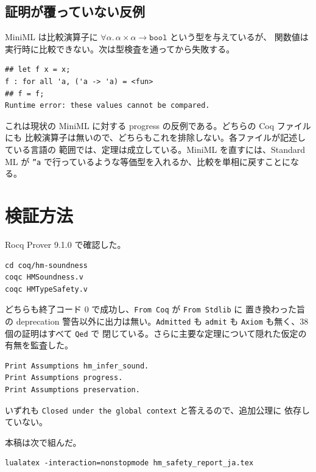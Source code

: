 \documentclass[11pt,a4paper]{ltjsarticle}
\newcommand{\tbool}{\mathtt{bool}}
\begin{document}
\subsection{証明が覆っていない反例}

MiniML は比較演算子に
$\forall\alpha.\,\alpha \times \alpha \to \tbool$ という型を与えているが、
関数値は実行時に比較できない。次は型検査を通ってから失敗する。

\begin{lstlisting}
## let f x = x;
f : for all 'a, ('a -> 'a) = <fun>
## f = f;
Runtime error: these values cannot be compared.
\end{lstlisting}

これは現状の MiniML に対する progress の反例である。どちらの Coq ファイルにも
比較演算子は無いので、どちらもこれを排除しない。各ファイルが記述している言語の
範囲では、定理は成立している。MiniML を直すには、Standard ML が
\texttt{''a} で行っているような等価型を入れるか、比較を単相に戻すことになる。

\section{検証方法}

Rocq Prover 9.1.0 で確認した。

\begin{lstlisting}
cd coq/hm-soundness
coqc HMSoundness.v
coqc HMTypeSafety.v
\end{lstlisting}

どちらも終了コード 0 で成功し、\texttt{From Coq} が \texttt{From Stdlib} に
置き換わった旨の deprecation 警告以外に出力は無い。\texttt{Admitted} も
\texttt{admit} も \texttt{Axiom} も無く、38 個の証明はすべて \texttt{Qed} で
閉じている。さらに主要な定理について隠れた仮定の有無を監査した。

\begin{lstlisting}
Print Assumptions hm_infer_sound.
Print Assumptions progress.
Print Assumptions preservation.
\end{lstlisting}

いずれも \texttt{Closed under the global context} と答えるので、追加公理に
依存していない。

本稿は次で組んだ。

\begin{lstlisting}
lualatex -interaction=nonstopmode hm_safety_report_ja.tex
\end{lstlisting}
\end{document}
